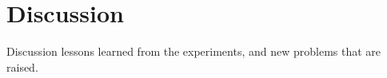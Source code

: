 \chapter{Discussion}\label{chap:discussion}
Discussion lessons learned from the experiments, and new problems that are raised. 